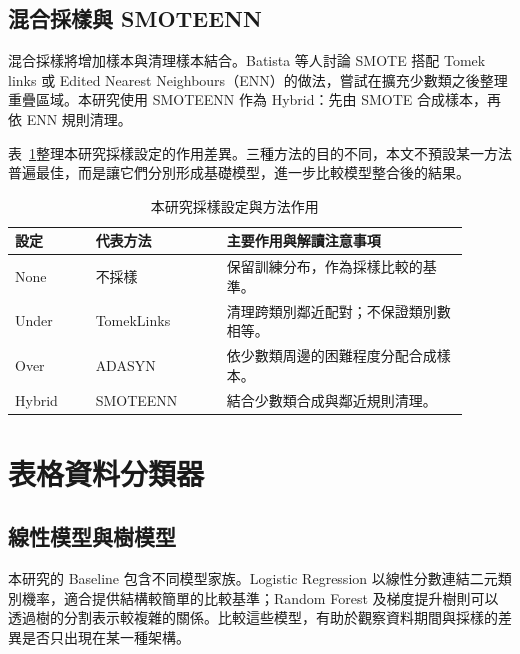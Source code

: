 \subsection{混合採樣與 SMOTEENN}

混合採樣將增加樣本與清理樣本結合。Batista 等人\autocite{batista2004balancing}討論 SMOTE 搭配 Tomek links 或 Edited Nearest Neighbours（ENN）的做法，嘗試在擴充少數類之後整理重疊區域。本研究使用 SMOTEENN 作為 Hybrid：先由 SMOTE 合成樣本，再依 ENN 規則清理。

表~\ref{tab:lit-sampling}整理本研究採樣設定的作用差異。三種方法的目的不同，本文不預設某一方法普遍最佳，而是讓它們分別形成基礎模型，進一步比較模型整合後的結果。

\begin{table}[htbp]
\centering\small
{}\setlength{\tabcolsep}{4pt}
\caption{本研究採樣設定與方法作用}\label{tab:lit-sampling}
\begin{tabular}{@{}p{0.16\linewidth}p{0.26\linewidth}p{0.48\linewidth}@{}}
\toprule
設定 & 代表方法 & 主要作用與解讀注意事項 \\
\midrule
None & 不採樣 & 保留訓練分布，作為採樣比較的基準。 \\[4pt]
Under & TomekLinks & 清理跨類別鄰近配對；不保證類別數相等。 \\[4pt]
Over & ADASYN & 依少數類周邊的困難程度分配合成樣本。 \\[4pt]
Hybrid & SMOTEENN & 結合少數類合成與鄰近規則清理。 \\
\bottomrule
\end{tabular}
\par{}
\end{table}

\section{表格資料分類器}

\subsection{線性模型與樹模型}

本研究的 Baseline 包含不同模型家族。Logistic Regression 以線性分數連結二元類別機率，適合提供結構較簡單的比較基準；Random Forest 及梯度提升樹則可以透過樹的分割表示較複雜的關係。比較這些模型，有助於觀察資料期間與採樣的差異是否只出現在某一種架構。

